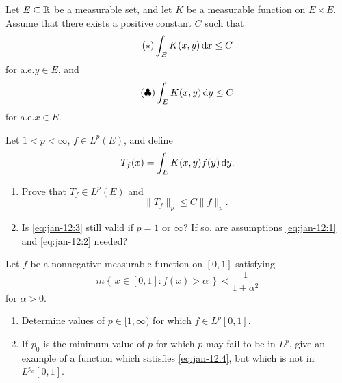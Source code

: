 \begin{problem}
  Let \(E\subseteq\mathbb{R}\) be a measurable set, and let \(K\) be a measurable
  function on \(E\times E\). Assume that there exists a positive constant
  \(C\) such that
  \[
    \label{eq:jan-12:1}
    \tag{\(\bigstar\)}
    \int_E K(x,y)\diff x\leq C
  \]
  for a.e.\@ \(y\in E\), and
  \[
    \label{eq:jan-12:2}
    \tag{\(\clubsuit\)}
    \int_E K(x,y)\mathop{}\!\mathrm{d} y\leq C
  \]
  for a.e.\@ \(x\in E\).

  Let \(1<p<\infty\), \(f\in L^p(E)\), and define
  \[
    T_f(x)=\int_E K(x,y)f(y)\mathop{}\!\mathrm{d} y.
  \]
  \begin{enumerate}[label=(\alph*),noitemsep]
  \item Prove that \(T_f\in L^p(E)\) and
    \[
      \label{eq:jan-12:3}
      \tag{\(\spadesuit\)}
      \|T_f\|_p\leq C\|f\|_p.
    \]
  \item Is \eqref{eq:jan-12:3} still valid if \(p=1\) or \(\infty\)? If so,
    are assumptions \eqref{eq:jan-12:1} and \eqref{eq:jan-12:2} needed?
  \end{enumerate}
\end{problem}
\begin{solution}
\end{solution}

\begin{problem}
  Let \(f\) be a nonnegative measurable function on \([0,1]\) satisfying
  \[
    \label{eq:jan-12:4}%
    \tag{\(\blacklozenge\)}%
    m\left\{\,x\in[0,1]:f(x)>\alpha\,\right\}<\frac{1}{1+\alpha^2}
  \]
  for \(\alpha>0\).
  \begin{enumerate}[label=(\alph*),noitemsep]
  \item Determine values of \(p\in[1,\infty)\) for which \(f\in L^p[0,1]\).
  \item If \(p_0\) is the minimum value of \(p\) for which \(p\) may fail
    to be in \(L^p\), give an example of a function which satisfies
    \eqref{eq:jan-12:4}, but which is not in \(L^{p_0}[0,1]\).
\end{enumerate}
\end{problem}
\begin{solution}
\end{solution}

